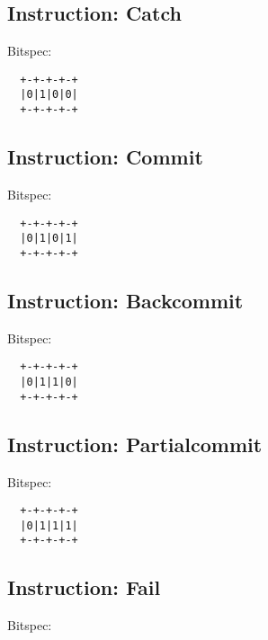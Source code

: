 \subsection{Instruction: Catch}

Bitspec:

\begin{myquote}
\begin{verbatim}
  +-+-+-+-+
  |0|1|0|0|
  +-+-+-+-+
\end{verbatim}
\end{myquote}
  
\subsection{Instruction: Commit}

Bitspec:

\begin{myquote}
\begin{verbatim}
  +-+-+-+-+
  |0|1|0|1|
  +-+-+-+-+
\end{verbatim}
\end{myquote}
  
\subsection{Instruction: Backcommit}

Bitspec:

\begin{myquote}
\begin{verbatim}
  +-+-+-+-+
  |0|1|1|0|
  +-+-+-+-+
\end{verbatim}
\end{myquote}
  
\subsection{Instruction: Partialcommit}

Bitspec:

\begin{myquote}
\begin{verbatim}
  +-+-+-+-+
  |0|1|1|1|
  +-+-+-+-+
\end{verbatim}
\end{myquote}
  
\subsection{Instruction: Fail}

Bitspec:

